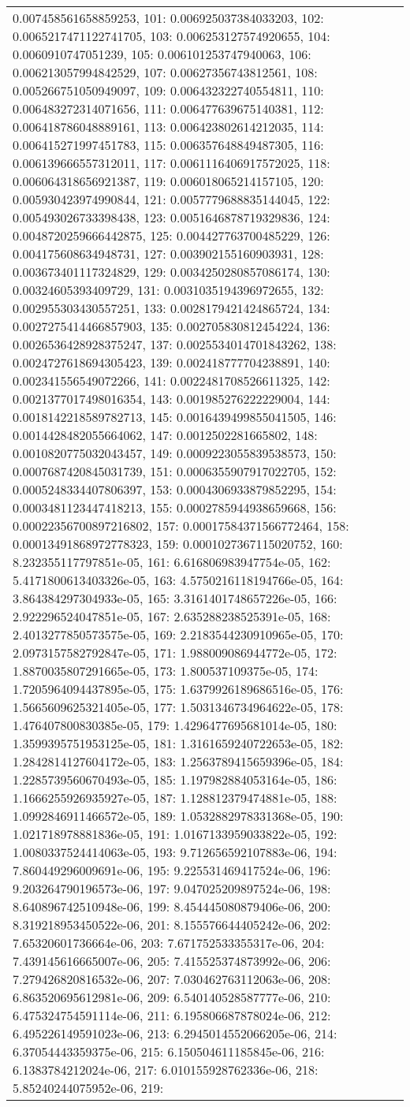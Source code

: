\begin{tabular}{lrl}
0.007458561658859253, 101: 0.006925037384033203, 102: 0.0065217471122741705, 103: 0.006253127574920655, 104: 0.0060910747051239, 105: 0.006101253747940063, 106: 0.006213057994842529, 107: 0.00627356743812561, 108: 0.005266751050949097, 109: 0.006432322740554811, 110: 0.006483272314071656, 111: 0.006477639675140381, 112: 0.006418786048889161, 113: 0.006423802614212035, 114: 0.006415271997451783, 115: 0.006357648849487305, 116: 0.006139666557312011, 117: 0.0061116406917572025, 118: 0.006064318656921387, 119: 0.006018065214157105, 120: 0.005930423974990844, 121: 0.0057779688835144045, 122: 0.005493026733398438, 123: 0.0051646878719329836, 124: 0.0048720259666442875, 125: 0.004427763700485229, 126: 0.004175608634948731, 127: 0.003902155160903931, 128: 0.003673401117324829, 129: 0.0034250280857086174, 130: 0.00324605393409729, 131: 0.0031035194396972655, 132: 0.002955303430557251, 133: 0.0028179421424865724, 134: 0.0027275414466857903, 135: 0.002705830812454224, 136: 0.0026536428928375247, 137: 0.0025534014701843262, 138: 0.0024727618694305423, 139: 0.002418777704238891, 140: 0.002341556549072266, 141: 0.0022481708526611325, 142: 0.0021377017498016354, 143: 0.001985276222229004, 144: 0.0018142218589782713, 145: 0.0016439499855041505, 146: 0.0014428482055664062, 147: 0.0012502281665802, 148: 0.0010820775032043457, 149: 0.0009223055839538573, 150: 0.0007687420845031739, 151: 0.0006355907917022705, 152: 0.0005248334407806397, 153: 0.0004306933879852295, 154: 0.0003481123447418213, 155: 0.0002785944938659668, 156: 0.00022356700897216802, 157: 0.00017584371566772464, 158: 0.00013491868972778323, 159: 0.0001027367115020752, 160: 8.232355117797851e-05, 161: 6.616806983947754e-05, 162: 5.4171800613403326e-05, 163: 4.5750216118194766e-05, 164: 3.864384297304933e-05, 165: 3.3161401748657226e-05, 166: 2.922296524047851e-05, 167: 2.635288238525391e-05, 168: 2.4013277850573575e-05, 169: 2.2183544230910965e-05, 170: 2.0973157582792847e-05, 171: 1.988009086944772e-05, 172: 1.8870035807291665e-05, 173: 1.800537109375e-05, 174: 1.7205964094437895e-05, 175: 1.6379926189686516e-05, 176: 1.5665609625321405e-05, 177: 1.5031346734964622e-05, 178: 1.476407800830385e-05, 179: 1.4296477695681014e-05, 180: 1.3599395751953125e-05, 181: 1.3161659240722653e-05, 182: 1.2842814127604172e-05, 183: 1.2563789415659396e-05, 184: 1.2285739560670493e-05, 185: 1.197982884053164e-05, 186: 1.1666255926935927e-05, 187: 1.128812379474881e-05, 188: 1.0992846911466572e-05, 189: 1.0532882978331368e-05, 190: 1.021718978881836e-05, 191: 1.0167133959033822e-05, 192: 1.0080337524414063e-05, 193: 9.712656592107883e-06, 194: 7.860449296009691e-06, 195: 9.225531469417524e-06, 196: 9.203264790196573e-06, 197: 9.047025209897524e-06, 198: 8.640896742510948e-06, 199: 8.454445080879406e-06, 200: 8.319218953450522e-06, 201: 8.155576644405242e-06, 202: 7.65320601736664e-06, 203: 7.671752533355317e-06, 204: 7.439145616665007e-06, 205: 7.415525374873992e-06, 206: 7.279426820816532e-06, 207: 7.030462763112063e-06, 208: 6.863520695612981e-06, 209: 6.540140528587777e-06, 210: 6.475324754591114e-06, 211: 6.195806687878024e-06, 212: 6.495226149591023e-06, 213: 6.2945014552066205e-06, 214: 6.37054443359375e-06, 215: 6.150504611185845e-06, 216: 6.1383784212024e-06, 217: 6.010155928762336e-06, 218: 5.85240244075952e-06, 219: 
\end{tabular}
